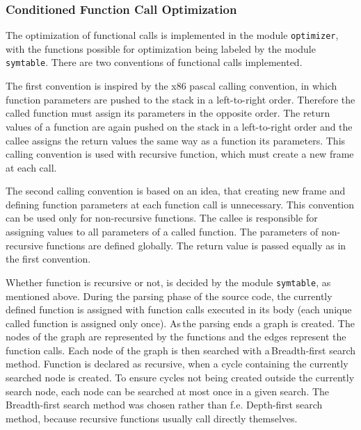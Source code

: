 \documentclass[12pt]{article}
\begin{document}
\subsubsection{Conditioned Function Call Optimization}
The optimization of functional calls is implemented in the module \texttt{optimizer}, with the functions possible for optimization being labeled by the module \texttt{symtable}.
There are two conventions of functional calls implemented. \par 
The first convention is inspired by the x86 pascal calling convention, in which function parameters are pushed to the stack in a left-to-right order. Therefore the called function must assign its parameters in the opposite order. The return values of a function are again pushed on the stack in a left-to-right order and the callee assigns the return values the same way as a function its parameters. This calling convention is used with recursive function, which must create a new frame at each call. \par
The second calling convention is based on an idea, that creating new frame and defining function parameters at each function call is unnecessary. This convention can be used only for non-recursive functions. The callee is responsible for assigning values to all parameters of a called function. The parameters of non-recursive functions are defined globally. The return value is passed equally as in the first convention. \par
Whether function is recursive or not, is decided by the module \texttt{symtable}, as mentioned above. During the parsing phase of the source code, the currently defined function is assigned with function calls executed in its body (each unique called function is assigned only once). As\,the parsing ends a graph is created. The nodes of the graph are represented by the functions and the edges represent the function calls. Each node of the graph is then searched with a\,Breadth-first search method. Function is declared as recursive, when a cycle containing the currently searched node is created. To ensure cycles not being created outside the currently search node, each node can be searched at most once in a given search. The Breadth-first search method was chosen rather than f.e. Depth-first search method, because recursive functions usually call directly themselves.
\end{document}
